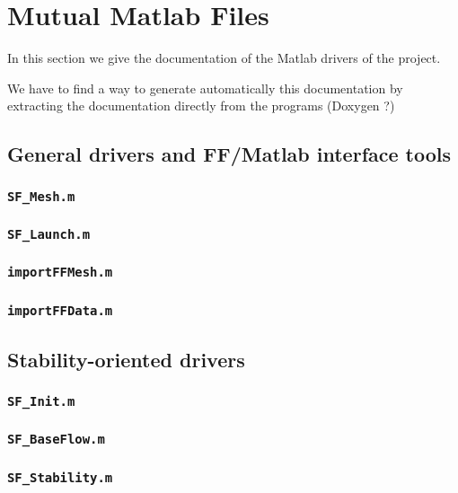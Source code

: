 \chapter{Mutual Matlab Files}

In this section we give the documentation of the Matlab drivers of the project.

We have to find a way to generate automatically this documentation by extracting the documentation directly from the programs
(Doxygen ?)


\section{General drivers and FF/Matlab interface tools}

\subsection{\texttt{SF\_Mesh.m}}

\subsection{\texttt{SF\_Launch.m}}

\subsection{\texttt{importFFMesh.m}}

\subsection{\texttt{importFFData.m}}


\section{Stability-oriented drivers}

\subsection{\texttt{SF\_Init.m}}

\subsection{\texttt{SF\_BaseFlow.m}}

\subsection{\texttt{SF\_Stability.m}}


